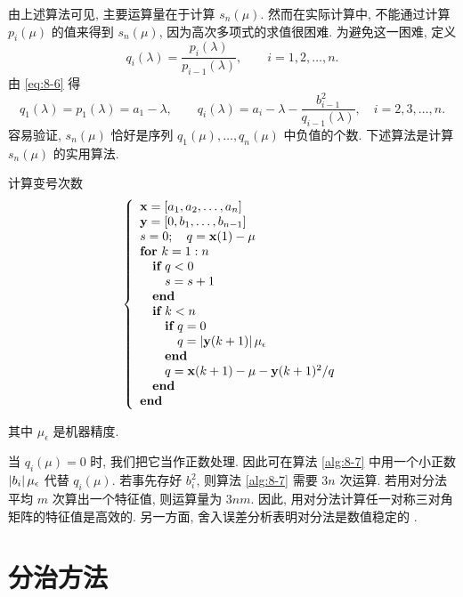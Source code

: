 由上述算法可见, 主要运算量在于计算 $s_n(\mu)$. 然而在实际计算中, 不能通过计算 $p_i(\mu)$ 的值来得到 $s_n(\mu)$, 因为高次多项式的求值很困难. 为避免这一困难, 定义
\[
  q_i(\lambda)=\frac{p_i(\lambda)}{p_{i-1}(\lambda)},
  \qquad i=1,2,\ldots,n.
\]
由 \eqref{eq:8-6} 得
\[
  q_1(\lambda)=p_1(\lambda)=a_1-\lambda,
  \qquad
  q_i(\lambda)=a_i-\lambda-\frac{b_{i-1}^2}{q_{i-1}(\lambda)},
  \quad i=2,3,\ldots,n.
\]
容易验证, $s_n(\mu)$ 恰好是序列 $q_1(\mu),\ldots,q_n(\mu)$ 中负值的个数. 下述算法是计算 $s_n(\mu)$ 的实用算法.

\begin{algorithm}{计算变号次数}
  \label{alg:8-7}
  \[
    \left\{
    \begin{array}{l}
      \mathbf{x}=[a_1,a_2,\ldots,a_n]\\
      \mathbf{y}=[0,b_1,\ldots,b_{n-1}]\\
      s=0;\quad q=\mathbf{x}(1)-\mu\\
      \textbf{for}\ k=1:n\\
      \quad \textbf{if}\ q<0\\
      \quad\quad s=s+1\\
      \quad \textbf{end}\\
      \quad \textbf{if}\ k<n\\
      \quad\quad \textbf{if}\ q=0\\
      \quad\quad\quad q=\left|\mathbf{y}(k+1)\right|\mu_\epsilon\\
      \quad\quad \textbf{end}\\
      \quad\quad q=\mathbf{x}(k+1)-\mu-\mathbf{y}(k+1)^2/q\\
      \quad \textbf{end}\\
      \textbf{end}
    \end{array}
    \right.
  \]
\end{algorithm}

其中 $\mu_\epsilon$ 是机器精度.

当 $q_i(\mu)=0$ 时, 我们把它当作正数处理. 因此可在算法 \ref{alg:8-7} 中用一个小正数 $\left|b_i\right|\mu_\epsilon$ 代替 $q_i(\mu)$. 若事先存好 $b_i^2$, 则算法 \ref{alg:8-7} 需要 $3n$ 次运算. 若用对分法平均 $m$ 次算出一个特征值, 则运算量为 $3nm$. 因此, 用对分法计算任一对称三对角矩阵的特征值是高效的. 另一方面, 舍入误差分析表明对分法是数值稳定的 \cite{src:95}.

\section{分治方法}
\label{sec:8-5}

